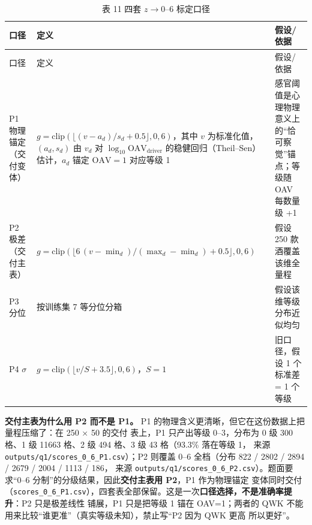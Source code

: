 \documentclass[
  a4paper,12pt]{article}
\begin{document}
\begin{longtable}[]{@{}
  >{\raggedright\arraybackslash}p{}
  >{\raggedright\arraybackslash}p{}
  >{\raggedright\arraybackslash}p{}@{}}
\caption{表 11 四套 \(z\to0\)--\(6\) 标定口径}\tabularnewline
\toprule\noalign{}
\begin{minipage}[b]{\linewidth}\raggedright
口径
\end{minipage} & \begin{minipage}[b]{\linewidth}\raggedright
定义
\end{minipage} & \begin{minipage}[b]{\linewidth}\raggedright
假设/依据
\end{minipage} \\
\midrule\noalign{}
\endfirsthead
\toprule\noalign{}
\begin{minipage}[b]{\linewidth}\raggedright
口径
\end{minipage} & \begin{minipage}[b]{\linewidth}\raggedright
定义
\end{minipage} & \begin{minipage}[b]{\linewidth}\raggedright
假设/依据
\end{minipage} \\
\midrule\noalign{}
\endhead
\bottomrule\noalign{}
\endlastfoot
P1 物理锚定（交付变体） &
\(g=\mathrm{clip}(\lfloor (v-a_d)/s_d+0.5\rfloor,0,6)\)，其中 \(v\)
为标准化值，\((a_d,s_d)\) 由 \(v_d\) 对
\(\log_{10}\mathrm{OAV}_{\text{driver}}\)
的稳健回归（Theil--Sen）估计，\(a_d\) 锚定 \(\mathrm{OAV}=1\) 对应等级 1
& 感官阈值是心理物理意义上的``恰可察觉''锚点；等级随 OAV 每数量级 +1 \\
P2 极差（交付主表） &
\(g=\mathrm{clip}(\lfloor 6\,(v-\min_d)/(\max_d-\min_d)+0.5\rfloor,0,6)\)
& 假设 250 款酒覆盖该维全量程 \\
P3 分位 & 按训练集 7 等分位分箱 & 假设该维等级分布近似均匀 \\
P4 \(\sigma\) & \(g=\mathrm{clip}(\lfloor v/S+3.5\rfloor,0,6)\)，\(S=1\)
& 旧口径，假设 1 个标准差 = 1 个等级 \\
\end{longtable}

\textbf{交付主表为什么用 P2 而不是 P1。} P1
的物理含义更清晰，但它在这份数据上把量程压缩了：在 250 × 50 的交付
表上，P1 只产出等级 0--3，分布为 0 级 300 格、1 级 11663 格、2 级 494
格、3 级 43 格（93.3\% 落在等级 1， 来源
\texttt{outputs/q1/scores\_0\_6\_P1.csv}）；P2 则覆盖 0--6 全档（分布
822 / 2802 / 2894 / 2679 / 2004 / 1113 / 186， 来源
\texttt{outputs/q1/scores\_0\_6\_P2.csv}）。题面要求``0--6
分制''的分级结果，因此\textbf{交付主表用 P2}，P1 作为物理锚定
变体同时交付（\texttt{scores\_0\_6\_P1.csv}），四套表全部保留。这是一次\textbf{口径选择，不是准确率提升}：P2
只是极差线性 铺展，P1 只是把等级 1 锚在 OAV=1；两者的 QWK
不能用来比较``谁更准''（真实等级未知），禁止写``P2 因为 QWK 更高
所以更好''。
\end{document}
